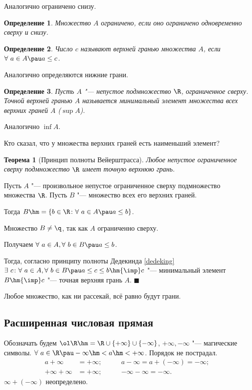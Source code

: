 \documentclass[a4paper,10pt,twoside]{article}
\newtheorem{Def}{Определение}[section]
\newtheorem{The}{Теорема}[section]
\newenvironment{Proof}
       {\par\noindent{\textbf{Доказательство.}}}
       {\hfill$\scriptstyle\blacksquare$}
\begin{document}
 Аналогично ограничено снизу.

 \begin{Def}
    Множество $A$ ограничено, если оно ограничено одновременно сверху и снизу.
 \end{Def}

 \begin{Def}
    Число $c$ называют верхней гранью множества $A$, если $\forall\  a\in A \pau a\leq c$.
 \end{Def}

 Аналогично определяются нижние грани.

 \begin{Def}\label{Dsup}
    Пусть $A$ "--- непустое подмножество $\R$, ограниченное сверху. Точной верхней гранью $A$ называется минимальный
     элемент множества всех верхних граней $A$ ($\sup A$).
 \end{Def}

 Аналогично $\inf A$.

 Кто сказал, что у множества верхних граней есть наименьший элемент?

 \begin{The}[Принцип полноты Вейерштрасса]
    Любое непустое ограниченное сверху подмножество $\R$ имеет точную верхнюю грань.
 \end{The}

 \begin{Proof}
    Пусть $A$ "--- произвольное непустое ограниченное сверху подмножество множества $\R$. Пусть $B$ "--- множество всех его верхних граней.

    Тогда $B\hm=\{b\in \R\colon \forall\  a\in A\pau a\leq b\}$.

    Множество $B\neq\q$, так как $A$ ограниченно сверху.

    Получаем $\forall\  a\in A, \forall\  b\in B\pau a\leq b$.

    Тогда, согласно принципу полноты Дедекинда \ref{dedeking} $\exists\  c\colon \forall\  a\in A,\forall\  b\in B\pau a\leq c\leq b \hm{\imp} c$ "--- минимальный элемент $B \hm{\imp} c$ "--- точная верхняя грань $A$.
 \end{Proof}

 Любое множество, как ни рассекай, всё равно будут грани.

\subsection{Расширенная числовая прямая}

 Обозначать будем $\ol\R\hm=\R\cup\{+\infty\}\cup\{-\infty\}$, $+\infty,-\infty$ "--- магические символы.
 $\forall\  a\in \R\pau -\infty\hm<a\hm<+\infty$.
 Порядок не пострадал.
 \begin{align*}a+\infty&=+\infty;\qquad &a-\infty =a+(-\infty)=-\infty;\\
 +\infty+\infty&=+\infty;\qquad &-\infty-\infty =-\infty.\end{align*}
 $\infty+(-\infty)$ неопределено.
\end{document}

